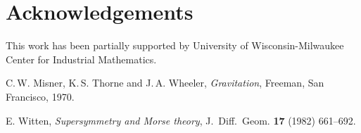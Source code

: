 \documentclass{cmmse2014}
\begin{document}
\section*{Acknowledgements}

This work has been partially supported by University of
Wisconsin-Milwaukee Center for Industrial Mathematics.


%
%

\begin{thebibliography}{99}

  {\sc C.\,W. Misner, K.\,S. Thorne and J.\,A. Wheeler},
  {\em Gravitation},
  Freeman, San Francisco, 1970.

  {\sc E. Witten},
  {\em Supersymmetry and Morse theory},
  {\rm J.~Diff.\ Geom.} {\bf 17} (1982) 661--692.

\end{thebibliography}
\end{document}

